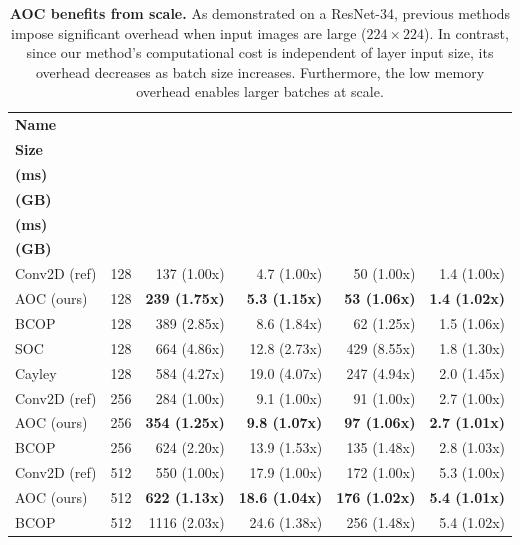 \begin{table}[ht]
    \centering
    \small
    \begin{tabular}{lrrrrr}
        \textbf{Name} & \makecell[r]{\textbf{Batch}\\\textbf{Size}} & \makecell[r]{\textbf{Train Time}\\\textbf{(ms)}} & \makecell[r]{\textbf{Train Memory}\\\textbf{(GB)}} & \makecell[r]{\textbf{Test Time}\\\textbf{(ms)}} & \makecell[r]{\textbf{Test Memory}\\\textbf{(GB)}} \\
        \hline
            Conv2D (ref) & 128 & 137 (1.00x) & 4.7 (1.00x) & 50 (1.00x) & 1.4 (1.00x) \\
            AOC (ours) & 128 & \textbf{239 (1.75x)} & \textbf{5.3 (1.15x)} & \textbf{53 (1.06x)} & \textbf{1.4 (1.02x)} \\ 
            BCOP & 128 & 389 (2.85x) & 8.6 (1.84x) & 62 (1.25x) & 1.5 (1.06x) \\
            SOC & 128 & 664 (4.86x) & 12.8 (2.73x) & 429 (8.55x) & 1.8 (1.30x) \\
            Cayley & 128 & 584 (4.27x) & 19.0 (4.07x) & 247 (4.94x) & 2.0 (1.45x) \\
        \hline
            Conv2D (ref) & 256 & 284 (1.00x) & 9.1 (1.00x) & 91 (1.00x) & 2.7 (1.00x) \\ 
            AOC (ours) & 256 & \textbf{354 (1.25x)} & \textbf{9.8 (1.07x)} & \textbf{97 (1.06x)} & \textbf{2.7 (1.01x)} \\ 
            BCOP & 256 & 624 (2.20x) & 13.9 (1.53x) & 135 (1.48x) & 2.8 (1.03x) \\
        \hline
            Conv2D (ref) & 512 & 550 (1.00x) & 17.9 (1.00x) & 172 (1.00x) & 5.3 (1.00x) \\
            AOC (ours) & 512 & \textbf{622 (1.13x)} & \textbf{18.6 (1.04x)} & \textbf{176 (1.02x)} & \textbf{5.4 (1.01x)} \\ 
            BCOP & 512 & 1116 (2.03x) & 24.6 (1.38x) & 256 (1.48x) & 5.4 (1.02x) \\
    \end{tabular}
    \caption{\textbf{AOC benefits from scale.} As demonstrated on a ResNet-34, previous methods impose significant overhead when input images are large ($224 \times 224$). In contrast, since our method's computational cost is independent of layer input size, its overhead decreases as batch size increases. Furthermore, the low memory overhead enables larger batches at scale.\vspace{-4mm}}
    \label{tab:comparison_overhead}
\end{table}



